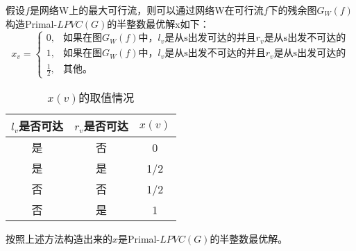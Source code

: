 假设$f$是网络W上的最大可行流，则可以通过网络W在可行流$f$下的残余图$G_W(f)$构造Primal-$LPVC(G)$的半整数最优解x如下：
\begin{equation*}
  x_v = \begin{cases}
            0, & \mbox{如果在图$G_W(f)$中，$l_v$是从s出发可达的并且$r_v$是从s出发不可达的}  \\
            1, & \mbox{如果在图$G_W(f)$中，$l_v$是从s出发不可达的并且$r_v$是从s出发可达的}  \\
            \frac{1}{2}, & \mbox{其他。}
          \end{cases}
\end{equation*}

\begin {table}[H]
\caption {$x(v)$的取值情况} \label{tab:x_v}
\begin{center}
\begin{tabular}
{|c|c|c|}
\toprule[1.5pt]
\bf $l_v$是否可达  & \bf $r_v$是否可达 & \bf $x(v)$ \\
\midrule
是  & 否 & 0\\
是  & 是 & 1/2\\
否  & 否 & 1/2\\
否  & 是 & 1\\
\bottomrule[1.25pt]
\end {tabular}
\end{center}
\end {table} 

\begin{lemma}
按照上述方法构造出来的$x$是Primal-$LPVC(G)$的半整数最优解。
\end{lemma}

